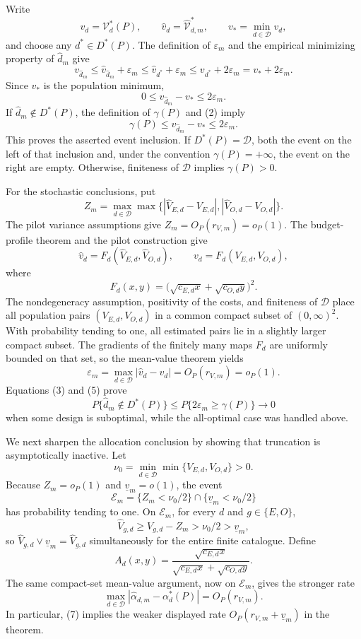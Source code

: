 Write
\[
 v_d=\mathcal V_d^*(P),\qquad
 \widehat v_d=\widehat{\mathcal V}_{d,m}^*,\qquad
 v_*=\min_{d\in\mathcal D}v_d,
\]
and choose any \(d^*\in D^*(P)\).  The definition of \(\varepsilon_m\) and the empirical minimizing property of \(\widehat d_m\) give
\[
 v_{\widehat d_m}
 \le \widehat v_{\widehat d_m}+\varepsilon_m
 \le \widehat v_{d^*}+\varepsilon_m
 \le v_{d^*}+2\varepsilon_m
 =v_*+2\varepsilon_m.                                      \tag{1}
\]
Since \(v_*\) is the population minimum,
\[
 0\le v_{\widehat d_m}-v_*\le2\varepsilon_m.                \tag{2}
\]
If \(\widehat d_m\notin D^*(P)\), the definition of \(\gamma(P)\) and (2) imply
\[
 \gamma(P)\le v_{\widehat d_m}-v_*\le2\varepsilon_m.        \tag{3}
\]
This proves the asserted event inclusion.  If \(D^*(P)=\mathcal D\), both the event on the left of that inclusion and, under the convention \(\gamma(P)=+\infty\), the event on the right are empty.  Otherwise, finiteness of \(\mathcal D\) implies \(\gamma(P)>0\).

For the stochastic conclusions, put
\[
 Z_m=\max_{d\in\mathcal D}\max\bigl\{
 |\widehat V_{E,d}-V_{E,d}|,
 |\widehat V_{O,d}-V_{O,d}|\bigr\}.
\]
The pilot variance assumptions give \(Z_m=O_P(r_{V,m})=o_P(1)\).  The budget-profile theorem and the pilot construction give
\[
 \widehat v_d=F_d(\widehat V_{E,d},\widehat V_{O,d}),
 \qquad
 v_d=F_d(V_{E,d},V_{O,d}),                                  \tag{4}
\]
where
\[
 F_d(x,y)=\bigl(\sqrt{c_{E,d}x}+\sqrt{c_{O,d}y}\bigr)^2.
\]
The nondegeneracy assumption, positivity of the costs, and finiteness of \(\mathcal D\) place all population pairs \((V_{E,d},V_{O,d})\) in a common compact subset of \((0,\infty)^2\).  With probability tending to one, all estimated pairs lie in a slightly larger compact subset.  The gradients of the finitely many maps \(F_d\) are uniformly bounded on that set, so the mean-value theorem yields
\[
 \varepsilon_m=\max_{d\in\mathcal D}|\widehat v_d-v_d|
 =O_P(r_{V,m})=o_P(1).                                      \tag{5}
\]
Equations (3) and (5) prove
\[
 P\{\widehat d_m\notin D^*(P)\}
 \le P\{2\varepsilon_m\ge\gamma(P)\}\longrightarrow0     \tag{6}
\]
when some design is suboptimal, while the all-optimal case was handled above.

We next sharpen the allocation conclusion by showing that truncation is asymptotically inactive.  Let
\[
 \nu_0=\min_{d\in\mathcal D}\min\{V_{E,d},V_{O,d}\}>0.
\]
Because \(Z_m=o_P(1)\) and \(\underline v_m=o(1)\), the event
\[
 \mathcal E_m=\{Z_m<\nu_0/2\}\cap\{\underline v_m<\nu_0/2\}
\]
has probability tending to one.  On \(\mathcal E_m\), for every \(d\) and \(g\in\{E,O\}\),
\[
 \widehat V_{g,d}\ge V_{g,d}-Z_m>\nu_0/2>\underline v_m,
\]
so \(\widehat V_{g,d}\vee\underline v_m=\widehat V_{g,d}\) simultaneously for the entire finite catalogue.  Define
\[
 A_d(x,y)=
 \frac{\sqrt{c_{E,d}x}}
 {\sqrt{c_{E,d}x}+\sqrt{c_{O,d}y}}.
\]
The same compact-set mean-value argument, now on \(\mathcal E_m\), gives the stronger rate
\[
 \max_{d\in\mathcal D}
 |\widehat\alpha_{d,m}-\alpha_d^*(P)|=O_P(r_{V,m}).           \tag{7}
\]
In particular, (7) implies the weaker displayed rate \(O_P(r_{V,m}+\underline v_m)\) in the theorem.

